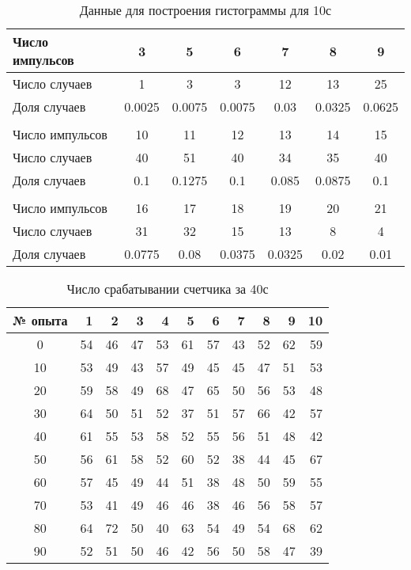 \documentclass[a4paper, 12pt]{article}
\begin{document}
    \begin{table}[H]
    \begin{center}
    \begin{tabular}{|l|c|c|c|c|c|c|}\hline
    Число импульсов & 3 & 5 & 6 & 7 & 8 & 9 \\\hline
    Число случаев & 1 & 3 & 3 & 12 & 13 & 25 \\\hline
    Доля случаев & 0.0025 & 0.0075 & 0.0075 & 0.03 & 0.0325 & 0.0625 \\\hline
    \multicolumn{7}{c}{}\\\hline
    Число импульсов & 10 & 11 & 12 & 13 & 14 & 15 \\\hline
    Число случаев & 40 & 51 & 40 & 34 & 35 & 40 \\\hline
    Доля случаев & 0.1 & 0.1275 & 0.1 & 0.085 & 0.0875 & 0.1 \\\hline
    \multicolumn{7}{c}{}\\\hline
    Число импульсов &16 & 17 & 18 & 19 & 20 & 21 \\\hline
    Число случаев & 31 & 32 & 15 & 13 & 8 & 4 \\\hline
    Доля случаев & 0.0775 & 0.08 & 0.0375 & 0.0325 & 0.02 & 0.01 \\\hline
    \end{tabular}
    \caption{Данные для построения гистограммы для 10с}
    \end{center}
    \end{table}
    \newpage

    \begin{table}[H]
    \begin{center}
    \begin{tabular}{|c|r|r|r|r|r|r|r|r|r|r|}
    \hline
    {№ опыта} &   1 &   2 &   3 &   4 &   5 &   6 &   7 &   8 &   9 &  10 \\
    \hline
	0 &  54 &  46 &  47 &  53 &  61 &  57 &  43 &  52 &  62 &  59 \\
	10 &  53 &  49 &  43 &  57 &  49 &  45 &  45 &  47 &  51 &  53 \\
	20 &  59 &  58 &  49 &  68 &  47 &  65 &  50 &  56 &  53 &  48 \\
	30 &  64 &  50 &  51 &  52 &  37 &  51 &  57 &  66 &  42 &  57 \\	
	40 &  61 &  55 &  53 &  58 &  52 &  55 &  56 &  51 &  48 &  42 \\	
	50 &  56 &  61 &  58 &  52 &  60 &  52 &  38 &  44 &  45 &  67 \\	
	60 &  57 &  45 &  49 &  44 &  51 &  38 &  48 &  50 &  59 &  55 \\	
	70 &  53 &  41 &  49 &  46 &  46 &  38 &  46 &  56 &  58 &  57 \\ 	
	80 &  64 &  72 &  50 &  40 &  63 &  54 &  49 &  54 &  68 &  62 \\
	90 &  52 &  51 &  50 &  46 &  42 &  56 &  50 &  58 &  47 &  39 \\
    \hline
    \end{tabular}
    \caption{Число срабатывании счетчика за 40с}
    \end{center}
    \end{table}
\end{document}
